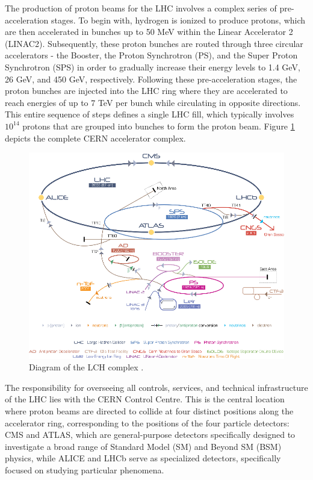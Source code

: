 The production of proton beams for the LHC involves a complex series of pre-acceleration stages. To begin with, hydrogen is ionized to produce protons, which are then accelerated in bunches up to 50 MeV within the Linear Accelerator 2 (LINAC2). Subsequently, these proton bunches are routed through three circular accelerators - the Booster, the Proton Synchrotron (PS), and the Super Proton Synchrotron (SPS)  in order to gradually increase their energy levels to 1.4 GeV, 26 GeV, and 450 GeV, respectively. Following these pre-acceleration stages, the proton bunches are injected into the LHC ring where they are accelerated to reach energies of up to 7 TeV per bunch while circulating in opposite directions. This entire sequence of steps defines a single LHC fill, which typically involves $10^{14}$ protons that are grouped into bunches to form the proton beam. Figure \ref{lhc_com} depicts the complete CERN accelerator complex.

\begin{center}
  \begin{figure}[h]
    \centering
    \includegraphics[scale=.45]{Chapter1/lhc_complex_fig.png}
    \caption[LHC Complex]{Diagram of the LCH complex \cite{lhc_complex}.}
    \label{lhc_com}
  \end{figure}
\end{center}

The responsibility for overseeing all controls, services, and technical infrastructure of the LHC lies with the CERN Control Centre. This is the central location where proton beams are directed to collide at four distinct positions along the accelerator ring, corresponding to the positions of the four particle detectors: CMS and ATLAS, which are general-purpose detectors specifically designed to investigate a broad range of Standard Model (SM) and Beyond SM (BSM) physics, while ALICE and LHCb serve as specialized detectors, specifically focused on studying particular phenomena.

